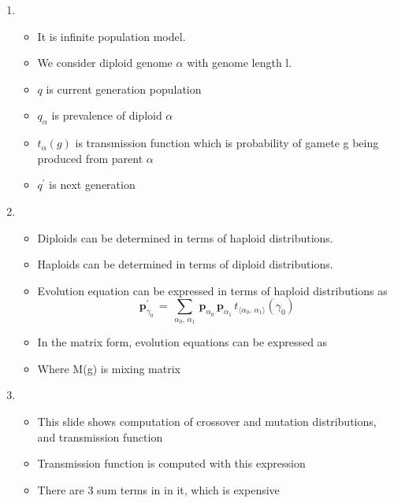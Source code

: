 \documentclass{article}
\begin{document}
\begin{enumerate}
\item
  \begin{itemize}
  \item It is infinite population model.
  \item We consider diploid genome $\alpha$ with genome length l.
  \item $q$ is current generation population
  \item $q_\alpha$ is prevalence of diploid $\alpha$
  \item $t_{\alpha}(g)$ is transmission function which is probability
    of gamete g being produced from parent $\alpha$
  \item $q^\prime$ is next generation
  \end{itemize}
    
\item
  \begin{itemize}
  \item Diploids can be determined in terms of haploid
    distributions.
  \item Haploids can be determined in terms of diploid
    distributions.
  \item Evolution equation can be expressed in terms of haploid
    distributions as 
    \[\bm{p}_{\gamma_0}^{\prime} \,=\, \sum_{\alpha_0, \, \alpha_1} \, \bm{p}_{\alpha_0} \, \bm{p}_{\alpha_1} \,
	  t_{\langle \alpha_0, \,\alpha_1 \rangle}(\gamma_0) \]
	  
  \item In the matrix form, evolution equations can be expressed as
  \item Where M(g) is mixing matrix
  \end{itemize}
    
\item
  \begin{itemize}
  \item This slide shows computation of crossover and mutation
    distributions, and transmission function  
  \item Transmission function is computed with this expression
  \item There are 3 sum terms in in it, which is expensive
  \end{itemize}
    

\end{enumerate}
\end{document}
